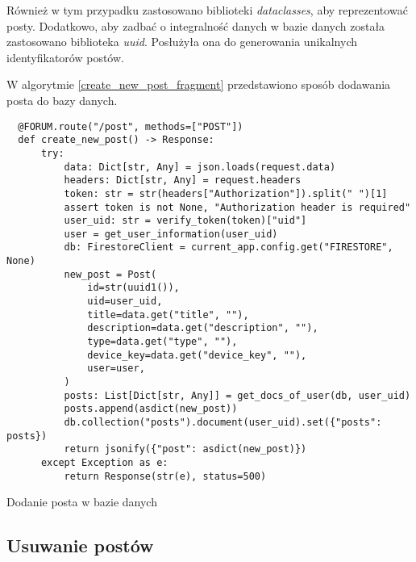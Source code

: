 Również w tym przypadku zastosowano biblioteki \textit{dataclasses}, aby reprezentować posty. Dodatkowo, aby zadbać o integralność danych w bazie danych została zastosowano biblioteka \textit{uuid}. Posłużyła ona do generowania unikalnych identyfikatorów postów.

W algorytmie \ref{create_new_post_fragment} przedstawiono sposób dodawania posta do bazy danych.

\begin{code}[H]
  \begin{verbatim}
  @FORUM.route("/post", methods=["POST"])
  def create_new_post() -> Response:
      try:
          data: Dict[str, Any] = json.loads(request.data)
          headers: Dict[str, Any] = request.headers
          token: str = str(headers["Authorization"]).split(" ")[1]
          assert token is not None, "Authorization header is required"
          user_uid: str = verify_token(token)["uid"]
          user = get_user_information(user_uid)
          db: FirestoreClient = current_app.config.get("FIRESTORE", None)
          new_post = Post(
              id=str(uuid1()),
              uid=user_uid,
              title=data.get("title", ""),
              description=data.get("description", ""),
              type=data.get("type", ""),
              device_key=data.get("device_key", ""),
              user=user,
          )
          posts: List[Dict[str, Any]] = get_docs_of_user(db, user_uid)
          posts.append(asdict(new_post))
          db.collection("posts").document(user_uid).set({"posts": posts})
          return jsonify({"post": asdict(new_post)})
      except Exception as e:
          return Response(str(e), status=500)
  \end{verbatim}
  \caption{Dodanie posta w bazie danych}
  \label{create_new_post_fragment}
\end{code}

\subsection{Usuwanie postów}

